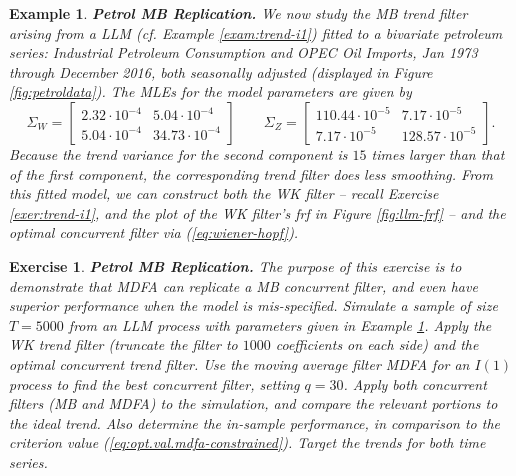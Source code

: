 \documentclass[a4paper]{book}
\newtheorem{Example}{Example}
\newtheorem{Exercise}{Exercise}
\begin{document}
  

\begin{Example} {\bf Petrol MB Replication.} \rm
\label{exam:petrol-mb}
We now  study the  MB trend filter arising from a LLM  
(cf. Example \ref{exam:trend-i1}) fitted
 to a   bivariate petroleum series:
  Industrial Petroleum Consumption and OPEC Oil Imports, Jan 1973 through December 2016,
 both seasonally adjusted  (displayed in Figure \ref{fig:petroldata}).
   The MLEs for the model parameters are  given by
\[
 \Sigma_{W} = \left[ \begin{array}{ll} 
   2.32 \cdot 10^{-4} &  5.04 \cdot 10^{-4} \\
   5.04 \cdot 10^{-4}  & 34.73 \cdot 10^{-4}  \end{array}  \right]
 \qquad  \Sigma_{Z} = \left[ \begin{array}{ll}
        110.44 \cdot 10^{-5} &  7.17 \cdot 10^{-5}  \\
        7.17 \cdot 10^{-5} & 128.57 \cdot 10^{-5}   \end{array} \right].
\]
  Because the trend variance for the second component is $15$ times 
  larger than that of the first component,
 the corresponding trend filter  does less smoothing. 
 From this fitted model,  we can construct both the WK filter -- recall Exercise
  \ref{exer:trend-i1}, and the plot of the WK filter's frf in Figure \ref{fig:llm-frf} --
  and the optimal concurrent filter via (\ref{eq:wiener-hopf}).
\end{Example}

\begin{Exercise} {\bf Petrol MB Replication.}  \rm
\label{exer:petrol-mb}
 The purpose of this exercise is to demonstrate that MDFA can replicate
 a MB concurrent filter, and even have superior performance when the 
 model is mis-specified. 
 Simulate a sample of size $T=5000$ from an LLM process with parameters
 given in Example \ref{exam:petrol-mb}.   Apply the WK trend filter
(truncate the filter to $1000$ coefficients on each side) and the 
 optimal concurrent trend filter.  
 Use the moving average filter  MDFA  for an $I(1)$ process  to find the best
 concurrent filter, setting $q= 30$.
    Apply both concurrent filters (MB and MDFA)
 to the simulation, and compare the relevant portions to the ideal trend.
 Also determine the in-sample performance, in comparison to the criterion value
 (\ref{eq:opt.val.mdfa-constrained}).   Target the trends for both time series.
\end{Exercise}
\end{document}
